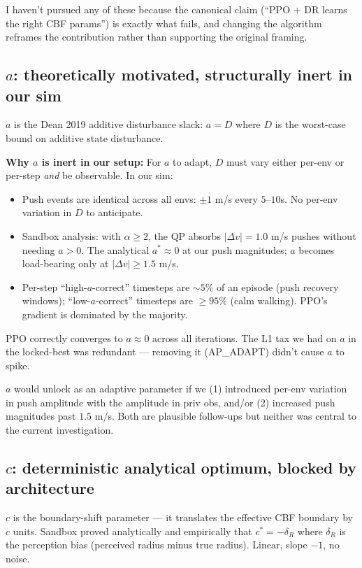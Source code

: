 \documentclass[11pt]{article}
\begin{document}
I haven't pursued any of these because the canonical claim (``PPO + DR learns the right CBF params'') is exactly what fails, and changing the algorithm reframes the contribution rather than supporting the original framing.

\subsection*{$a$: theoretically motivated, structurally inert in our sim}

$a$ is the Dean 2019 additive disturbance slack: $a = D$ where $D$ is the worst-case bound on additive state disturbance.

\textbf{Why $a$ is inert in our setup:} For $a$ to adapt, $D$ must vary either per-env or per-step \emph{and} be observable. In our sim:

\begin{itemize}
\item Push events are identical across all envs: $\pm 1$ m/s every $5$--$10$s. No per-env variation in $D$ to anticipate.
\item Sandbox analysis: with $\alpha \geq 2$, the QP absorbs $|\Delta v| = 1.0$ m/s pushes without needing $a > 0$. The analytical $a^* \approx 0$ at our push magnitudes; $a$ becomes load-bearing only at $|\Delta v| \geq 1.5$ m/s.
\item Per-step ``high-$a$-correct'' timesteps are $\sim 5\%$ of an episode (push recovery windows); ``low-$a$-correct'' timesteps are $\geq 95\%$ (calm walking). PPO's gradient is dominated by the majority.
\end{itemize}

PPO correctly converges to $a \approx 0$ across all iterations. The L1 tax we had on $a$ in the locked-best was redundant --- removing it (AP\_ADAPT) didn't cause $a$ to spike.

$a$ would unlock as an adaptive parameter if we (1) introduced per-env variation in push amplitude with the amplitude in priv obs, and/or (2) increased push magnitudes past $1.5$ m/s. Both are plausible follow-ups but neither was central to the current investigation.

\subsection*{$c$: deterministic analytical optimum, blocked by architecture}

$c$ is the boundary-shift parameter --- it translates the effective CBF boundary by $c$ units. Sandbox proved analytically and empirically that $c^* = -\delta_R$ where $\delta_R$ is the perception bias (perceived radius minus true radius). Linear, slope $-1$, no noise.
\end{document}
